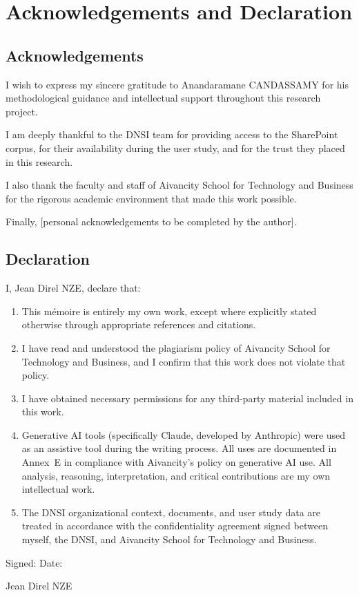 \chapter*{Acknowledgements and Declaration}

\section*{Acknowledgements}

I wish to express my sincere gratitude to Anandaramane CANDASSAMY for his methodological guidance and intellectual support throughout this research project.

I am deeply thankful to the DNSI team for providing access to the SharePoint corpus, for their availability during the user study, and for the trust they placed in this research.

I also thank the faculty and staff of Aivancity School for Technology and Business for the rigorous academic environment that made this work possible.

Finally, [personal acknowledgements to be completed by the author].

\bigskip

\section*{Declaration}

I, Jean Direl NZE, declare that:

\begin{enumerate}
  \item This mémoire is entirely my own work, except where explicitly stated otherwise through appropriate references and citations.
  \item I have read and understood the plagiarism policy of Aivancity School for Technology and Business, and I confirm that this work does not violate that policy.
  \item I have obtained necessary permissions for any third-party material included in this work.
  \item Generative AI tools (specifically Claude, developed by Anthropic) were used as an assistive tool during the writing process. All uses are documented in Annex~E in compliance with Aivancity's policy on generative AI use. All analysis, reasoning, interpretation, and critical contributions are my own intellectual work.
  \item The DNSI organizational context, documents, and user study data are treated in accordance with the confidentiality agreement signed between myself, the DNSI, and Aivancity School for Technology and Business.
\end{enumerate}

\bigskip

\noindent Signed: \underline{\hspace{5cm}} \hspace{2cm} Date: \underline{\hspace{3cm}}

\noindent Jean Direl NZE
